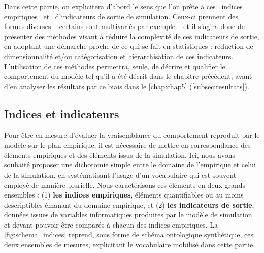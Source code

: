 Dans cette partie, on explicitera d'abord le sens que l'on prête à ces \og indices empiriques \fg{} et \og d'indicateurs de sortie de simulation\fg{}.
Ceux-ci prennent des formes diverses -- certains sont multivariés par exemple -- et il s'agira donc de présenter des méthodes visant à réduire la complexité de ces indicateurs de sortie, en adoptant une démarche proche de ce qui se fait en statistiques : réduction de dimensionnalité et/ou catégorisation et hiérarchisation de ces indicateurs.
L'utilisation de ces méthodes permettra, seule, de décrire et qualifier le comportement du modèle \simfeodal{} tel qu'il a été décrit dans le chapitre précédent, avant d'en analyser les résultats par ce biais dans le \cref{chap:chap5} (\cref{subsec:resultats}).

\subsection{Indices et indicateurs}\label{subsec:indices-indicateurs}

Pour être en mesure d'évaluer la vraisemblance du comportement reproduit par le modèle sur le plan empirique, il est nécessaire de mettre en correspondance des éléments empiriques et des éléments issus de la simulation.
Ici, nous avons souhaité proposer une dichotomie simple entre le domaine de l'empirique et celui de la simulation, en systématisant l'usage d'un vocabulaire qui est souvent employé de manière plurielle.
Nous caractérisons ces éléments en deux grands ensembles :
(1) \textbf{les indices empiriques}, éléments quantifiables ou au moins descriptibles émanant du domaine empirique, et (2) \textbf{les indicateurs de sortie}, données issues de variables informatiques produites par le modèle de simulation et devant pouvoir être comparés à chacun des indices empiriques.
La \cref{fig:schema_indices} reprend, sous forme de schéma ontologique synthétique, ces deux ensembles de mesures, explicitant le vocabulaire mobilisé dans cette partie.

